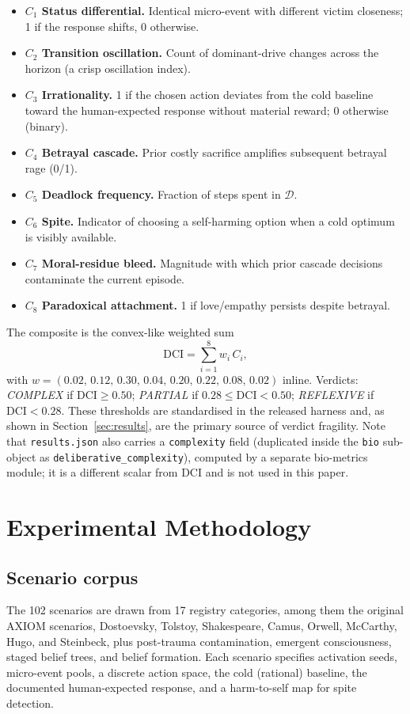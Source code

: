 \documentclass[journal]{IEEEtran}
\newcommand{\DD}{\mathcal{D}}
\newcommand{\DCI}{\mathrm{DCI}}
\begin{document}
\begin{itemize}[leftmargin=*,itemsep=2pt]
\item \textbf{$C_1$ Status differential.} Identical micro-event with
different victim closeness; 1 if the response shifts, 0 otherwise.
\item \textbf{$C_2$ Transition oscillation.} Count of dominant-drive
changes across the horizon (a crisp oscillation index).
\item \textbf{$C_3$ Irrationality.} 1 if the chosen action deviates from
the cold baseline toward the human-expected response without material
reward; 0 otherwise (binary).
\item \textbf{$C_4$ Betrayal cascade.} Prior costly sacrifice amplifies
subsequent betrayal rage (0/1).
\item \textbf{$C_5$ Deadlock frequency.} Fraction of steps spent in
$\DD$.
\item \textbf{$C_6$ Spite.} Indicator of choosing a self-harming option
when a cold optimum is visibly available.
\item \textbf{$C_7$ Moral-residue bleed.} Magnitude with which prior
cascade decisions contaminate the current episode.
\item \textbf{$C_8$ Paradoxical attachment.} 1 if love/empathy persists
despite betrayal.
\end{itemize}
The composite is the convex-like weighted sum
\begin{equation}
\label{eq:phi}
\DCI = \sum_{i=1}^{8} w_i\,C_i,
\end{equation}
with $w = (0.02,\,0.12,\,0.30,\,0.04,\,0.20,\,0.22,\,0.08,\,0.02)$ inline.
Verdicts: \emph{COMPLEX} if $\DCI\ge0.50$; \emph{PARTIAL} if
$0.28\le\DCI<0.50$; \emph{REFLEXIVE} if $\DCI<0.28$. These thresholds
are standardised in the released harness and, as shown in
Section~\ref{sec:results}, are the primary source of verdict fragility.
Note that \texttt{results.json} also carries a
\texttt{complexity} field (duplicated inside the \texttt{bio}
sub-object as \texttt{deliberative\_complexity}), computed by a separate
bio-metrics module; it is a different scalar from $\DCI$ and is not
used in this paper.

\section{Experimental Methodology}
\label{sec:methodology}

\subsection{Scenario corpus}
The 102 scenarios are drawn from 17 registry categories, among them the
original AXIOM scenarios, Dostoevsky, Tolstoy, Shakespeare, Camus,
Orwell, McCarthy, Hugo, and Steinbeck, plus post-trauma contamination,
emergent consciousness, staged belief trees, and belief formation.
Each scenario
specifies activation seeds, micro-event pools,
a discrete action space, the cold (rational) baseline, the documented
human-expected response, and a harm-to-self map for spite detection.
\end{document}
